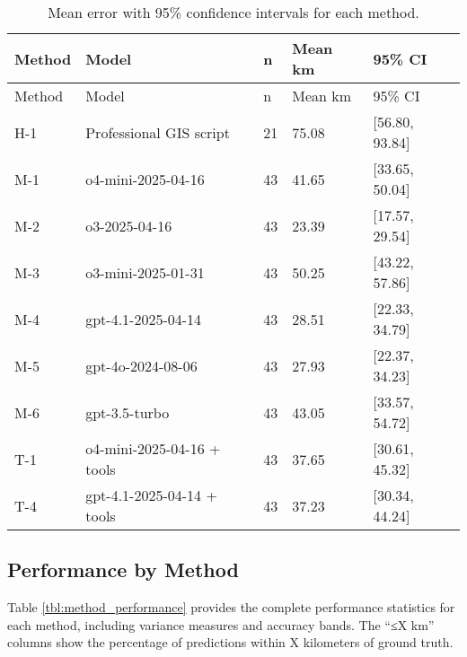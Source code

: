\begin{longtable}[]{@{}lllll@{}}
\caption{\label{tbl:error_ci}Mean error with 95\% confidence intervals
for each method.}\tabularnewline
\toprule\noalign{}
Method & Model & n & Mean km & 95\% CI \\
\midrule\noalign{}
\endfirsthead
\toprule\noalign{}
Method & Model & n & Mean km & 95\% CI \\
\midrule\noalign{}
\endhead
\bottomrule\noalign{}
\endlastfoot
H-1 & Professional GIS script & 21 & 75.08 & {[}56.80, 93.84{]} \\
M-1 & o4-mini-2025-04-16 & 43 & 41.65 & {[}33.65, 50.04{]} \\
M-2 & o3-2025-04-16 & 43 & 23.39 & {[}17.57, 29.54{]} \\
M-3 & o3-mini-2025-01-31 & 43 & 50.25 & {[}43.22, 57.86{]} \\
M-4 & gpt-4.1-2025-04-14 & 43 & 28.51 & {[}22.33, 34.79{]} \\
M-5 & gpt-4o-2024-08-06 & 43 & 27.93 & {[}22.37, 34.23{]} \\
M-6 & gpt-3.5-turbo & 43 & 43.05 & {[}33.57, 54.72{]} \\
T-1 & o4-mini-2025-04-16 + tools & 43 & 37.65 & {[}30.61, 45.32{]} \\
T-4 & gpt-4.1-2025-04-14 + tools & 43 & 37.23 & {[}30.34, 44.24{]} \\
\end{longtable}

\subsection{Performance by
Method}\label{b.2-performance-by-method}

Table \ref{tbl:method_performance} provides the complete performance
statistics for each method, including variance measures and accuracy
bands. The ``≤X km'' columns show the percentage of predictions within X
kilometers of ground truth.

